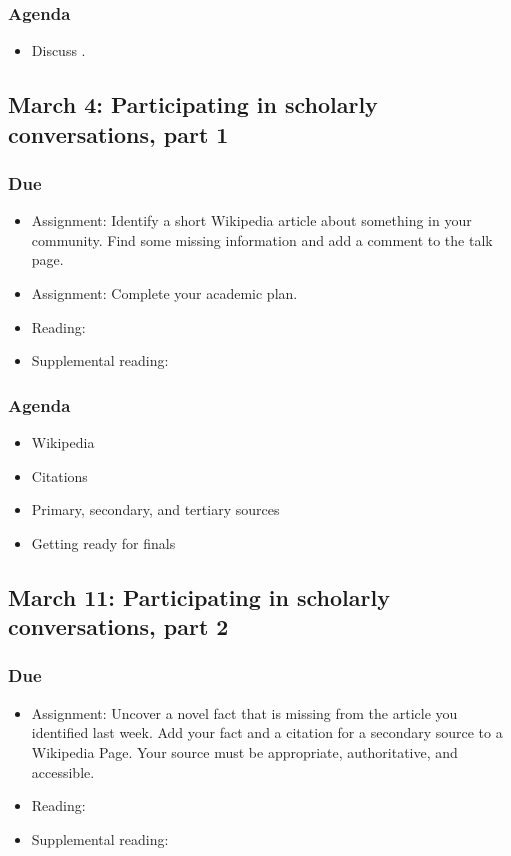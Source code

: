 \documentclass[12pt,article,oneside]{memoir}
\begin{document}
\subsubsection{Agenda}
\begin{itemize}
\item Discuss \cite{guillory2008s}.
\end{itemize}



\subsection{March 4: Participating in scholarly conversations, part 1}
\subsubsection{Due}
\begin{itemize}
 \item Assignment: Identify a short Wikipedia article about something in your community.  Find some missing information and add a comment to the talk page.
 \item Assignment: Complete your academic plan.
 \item Reading: \cite{eval}
 \item Supplemental reading: \cite{training}
\end{itemize}

\subsubsection{Agenda}
\begin{itemize}
\item Wikipedia
\item Citations
\item Primary, secondary, and tertiary sources
\item Getting ready for finals
\end{itemize}


\subsection{March 11: Participating in scholarly conversations, part 2}
\subsubsection{Due}
\begin{itemize}
 \item Assignment: Uncover a novel fact that is missing from the article you identified last week.  Add your fact and a citation for a secondary source to a Wikipedia Page.  Your source must be appropriate, authoritative, and accessible.
 \item Reading: \cite{eryk}
 \item Supplemental reading: \cite{doyle}
\end{itemize}
\end{document}
